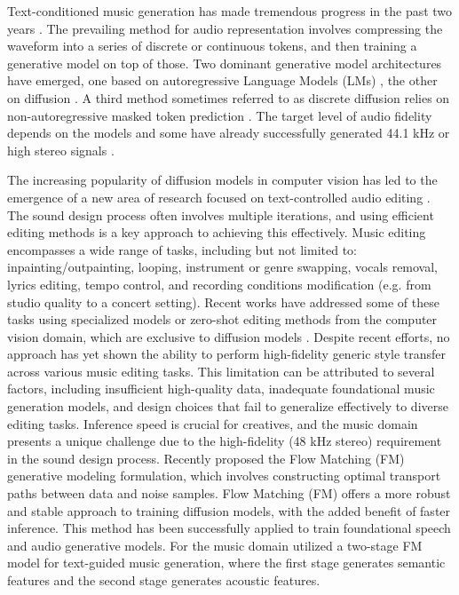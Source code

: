 Text-conditioned music generation has made tremendous progress in the past two years \citep{schneider2023mo,huang2023noise2music,agostinelli2023musiclm,copet2024simple,ziv2023masked,liu2023audioldm2,li2023jen,prajwalmusicflow}.
The prevailing method for audio representation involves compressing the waveform into a series of discrete or continuous tokens, and then training a generative model on top of those.
Two dominant generative model architectures have emerged, one based on autoregressive Language Models (LMs) \citep{agostinelli2023musiclm,copet2024simple}, the other on diffusion \citep{schneider2023mo,huang2023noise2music,liu2023audioldm2,li2023jen,prajwalmusicflow}.
A third method sometimes referred to as discrete diffusion relies on non-autoregressive masked token prediction \citep{ziv2023masked,garcia2023vampnet}.
The target level of audio fidelity depends on the models and some have already successfully generated 44.1 kHz or high stereo signals \citep{schneider2023mo,li2023jen,evans2024fast}.

The increasing popularity of diffusion models in computer vision has led to the emergence of a new area of research focused on text-controlled audio editing \citep{wang2023audit,lin2024arrange,garcia2023vampnet,wu2023music,novack2024ditto,zhang2024musicmagus,manor2024zero}.
The sound design process often involves multiple iterations, and using efficient editing methods is a key approach to achieving this effectively.
Music editing encompasses a wide range of tasks, including but not limited to: inpainting/outpainting, looping, instrument or genre swapping, vocals removal, lyrics editing, tempo control, and recording conditions modification (e.g. from studio quality to a concert setting).
Recent works have addressed some of these tasks using specialized models \citep{wang2023audit,garcia2023vampnet,lin2024arrange,wu2023music,copet2024simple} or zero-shot editing methods from the computer vision domain, which are exclusive to diffusion models \citep{novack2024ditto,zhang2024musicmagus,manor2024zero}.
Despite recent efforts, no approach has yet shown the ability to perform high-fidelity generic style transfer across various music editing tasks. This limitation can be attributed to several factors, including insufficient high-quality data, inadequate foundational music generation models, and design choices that fail to generalize effectively to diverse editing tasks.
Inference speed is crucial for creatives, and the music domain presents a unique challenge due to the high-fidelity (48 kHz stereo) requirement in the sound design process.
Recently \citet{lipman2022flow} proposed the Flow Matching (FM) generative modeling formulation, which involves constructing optimal transport paths between data and noise samples.
Flow Matching (FM) offers a more robust and stable approach to training diffusion models, with the added benefit of faster inference.
This method has been successfully applied to train foundational speech \citep{le2024voicebox} and audio \citep{vyas2023audiobox} generative models.
For the music domain \citet{prajwalmusicflow} utilized a two-stage FM model for text-guided music generation, where the first stage generates semantic features and the second stage generates acoustic features.

